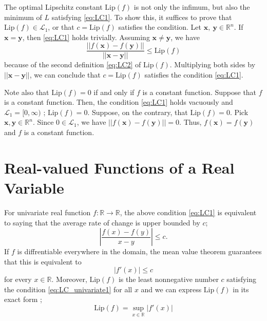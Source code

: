 \documentclass[11pt]{report}
\newcommand\bx{\ensuremath{\boldsymbol x}}
\newcommand\by{\ensuremath{\boldsymbol y}}
\newcommand\lip{\ensuremath{\text{Lip}}}
\begin{document}
The optimal Lipschitz constant \(\lip(f)\) is not only the infimum, but also the minimum of \(L\) satisfying \eqref{eq:LC1}.
To show this, it suffices to prove that \(\lip(f)\in\mathcal L_1\), or that \(c=\lip(f)\) satisfies the condition.
Let \(\bx,\:\by\in\mathbb R^n\).
If \(\bx=\by\), then \eqref{eq:LC1} holds trivially.
Assuming \(\bx\neq\by\), we have
\[
\frac{||f(\bx)-f(\by)||}{||\bx-\by||}\le\lip(f)
\]
because of the second definition \eqref{eq:LC2} of \(\lip(f)\).
Multiplying both sides by \(||\bx-\by||\), we can conclude that \(c=\lip(f)\) satisfies the condition \eqref{eq:LC1}.

Note also that \(\lip(f)=0\) if and only if \(f\) is a constant function.
Suppose that \(f\) is a constant function.
Then, the condition \eqref{eq:LC1} holds vacuously and \(\mathcal L_1=[0,\infty)\) ; \(\lip(f)=0\).
Suppose, on the contrary, that \(\lip(f)=0\).
Pick \(\bx,\by\in\mathbb R^n\).
Since \(0\in\mathcal L_1\), we have \(||f(\bx)-f(\by)||=0\).
Thus, \(f(\bx)=f(\by)\) and \(f\) is a constant function.

\section{Real-valued Functions of a Real Variable}

For univariate real function \(f:\mathbb R\to\mathbb R\), the above condition \eqref{eq:LC1} is equivalent to saying that the average rate of change is upper bounded by \(c\);
\begin{equation}\label{eq:LC_average_rate_of_change}
\left|\frac{f(x)-f(y)}{x-y}\right|\le c.
\end{equation}
If \(f\) is diffrentiable everywhere in the domain, the mean value theorem guarantees that this is equivalent to 
\begin{equation}\label{eq:LC_univariate1}
|f'(x)|\le c
\end{equation}
for every \(x\in\mathbb R\).
Moreover, \(\lip(f)\) is the least nonnegative number \(c\) satisfying the condition \eqref{eq:LC_univariate1} for all \(x\) and we can express \(\lip(f)\) in its exact form ; 
\begin{equation}\label{eq:LC_univariate2}
\lip (f) = \sup_{x\in\mathbb R}|f'(x)|
\end{equation}
\end{document}
